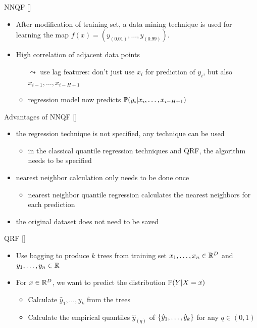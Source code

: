 \documentclass[10pt,aspectratio=169]{beamer}
\begin{document}
\begin{frame}{NNQF [\cite{Ordiano2020}]}
    \begin{itemize}
        \item After modification of training set, a data mining technique is used for learning the map \(f(x) = (y_{(0.01)}, \ldots, y_{(0.99)})\).
        \item High correlation of adjacent data points
        \begin{itemize}
            \item[\(\leadsto\)] use lag features: don't just use \(x_i\) for prediction of \(y_i\), but also 
            \(x_{i-1}, \ldots, x_{i-H+1}\)
            \item regression model now predicts \( \P(y_i | x_i, \ldots, x_{i-H+1}) \)
        \end{itemize}
    \end{itemize}
\end{frame}

\begin{frame}{Advantages of NNQF [\cite{Ordiano2020}]}
    \begin{itemize}
        \item the regression technique is not specified, any technique can be used
        \begin{itemize}
            \item in the classical quantile regression techniques and QRF, the algorithm needs to be specified
        \end{itemize}
        \item nearest neighbor calculation only needs to be done once
        \begin{itemize}
            \item nearest neighbor quantile regression calculates the nearest neighbors for each prediction
        \end{itemize}
        \item the original dataset does not need to be saved
    \end{itemize}
\end{frame}

\begin{frame}{QRF [\cite{Meinshausen2006}]}
    \begin{itemize}
        \item Use bagging to produce \(k\) trees from training set \(x_1, \ldots, x_n \in \R^D\) and \(y_1, \ldots, y_n \in \R\)
        \item For \(x\in \R^D\), we want to predict the distribution \(\P(Y | X=x)\)
        \begin{itemize}
            \item Calculate \(\hat{y}_1, \ldots, \hat{y}_k\) from the trees 
            \item Calculate the empirical quantiles \(\hat{y}_{(q)}\) of \(\set{\hat{y}_1, \ldots, \hat{y}_k}\) for any \(q \in (0,1)\)
        \end{itemize}
    \end{itemize}
\end{frame}
\end{document}
